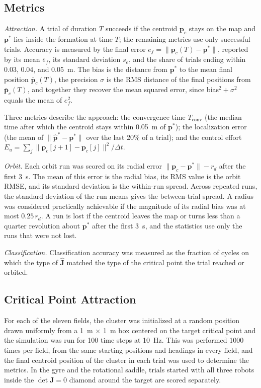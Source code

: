 \documentclass[lettersize,journal]{IEEEtran}
\newcommand{\rev}[1]{#1}
\begin{document}
\subsection{Metrics}
\label{sec:metrics}

\emph{Attraction.} A trial of duration $T$ succeeds if the centroid $\mathbf{p}_c$ stays on the map and $\mathbf{p}^*$ lies inside the formation at time $T$; the remaining metrics use only successful trials. Accuracy is measured by the final error $e_f = \|\mathbf{p}_c(T) - \mathbf{p}^*\|$, reported by its mean $\bar{e}_f$, its standard deviation $s_e$, and the share of trials ending within 0.03, 0.04, and 0.05~m. The bias is the distance from $\mathbf{p}^*$ to the mean final position $\bar{\mathbf{p}}_c(T)$, the precision $\sigma$ is the RMS distance of the final positions from $\bar{\mathbf{p}}_c(T)$, and together they recover the mean squared error, since bias$^2 + \sigma^2$ equals the mean of $e_f^2$.

Three metrics describe the approach: the convergence time $T_{\mathrm{conv}}$ (the median time after which the centroid stays within 0.05~m of $\mathbf{p}^*$); the localization error (the mean of $\|\hat{\mathbf{p}}^* - \mathbf{p}^*\|$ over the last 20\% of a trial); and the control effort $E_u = \sum_j \|\mathbf{p}_c[j+1] - \mathbf{p}_c[j]\|^2/\Delta t$.

\emph{Orbit.} Each orbit run was scored on its radial error $\|\mathbf{p}_c - \mathbf{p}^*\| - r_d$ after the first \rev{3}~s. The mean of this error is the radial bias, its RMS value is the orbit RMSE, and its standard deviation is the within-run spread. Across repeated runs, the standard deviation of the run means gives the between-trial spread. A radius was considered practically achievable if the magnitude of its radial bias was at most $0.25\,r_d$. A run is lost if the centroid leaves the map or turns less than a quarter revolution about $\mathbf{p}^*$ after the first \rev{3}~s, and the statistics use only the runs that were not lost.

\emph{Classification.} Classification accuracy was measured as the fraction of cycles on which the type of $\hat{\mathbf{J}}$ matched the type of the critical point the trial reached or orbited.

\subsection{Critical Point Attraction}
\label{sec:sim_attraction}

For each of the eleven fields, the cluster was initialized at a random position drawn uniformly from a 1~m $\times$ 1~m box centered on the target critical point and the simulation was run for 100 time steps at 10~Hz. This was performed 1000 times per field, from the same starting positions and headings in every field, and the final centroid position of the cluster in each trial was used to determine the metrics. In the gyre and the rotational saddle, trials started with all three robots inside the $\det\mathbf{J} = 0$ diamond around the target are scored separately.
\end{document}

